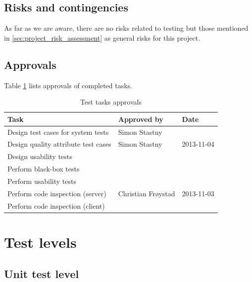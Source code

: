 \documentclass[11pt]{book}
\begin{document}
\subsection{Risks and contingencies}

As far as we are aware, there are no risks related to testing but those mentioned in \ref{sec:project_risk_assessment} as general risks for this project.

\subsection{Approvals}

Table \ref{tab:test_plan_approvals} lists approvals of completed tasks.

\begin{table}[H]
    \centering
    \begin{tabular}{| l | l | l |}
        \hline
        Task                                & Approved by             & Date           \\ \hline
        Design test cases for system tests  & Simon Stastny           &                \\ \hline
        Design quality attribute test cases & Simon Stastny           & 2013-11-04     \\ \hline
        Design usability tests              &                         &                \\ \hline
        Perform black-box tests             &                         &                \\ \hline
        Perform usability tests             &                         &                \\ \hline
        Perform code inspection (server)    & Christian Frøystad      & 2013-11-03     \\ \hline
        Perform code inspection (client)    &                         &                \\ \hline
    \end{tabular}
    \caption{Test tasks approvals}
    \label{tab:test_plan_approvals}
\end{table}


\section{Test levels}\label{sec:testlevels}

\subsection{Unit test level}
\end{document}
